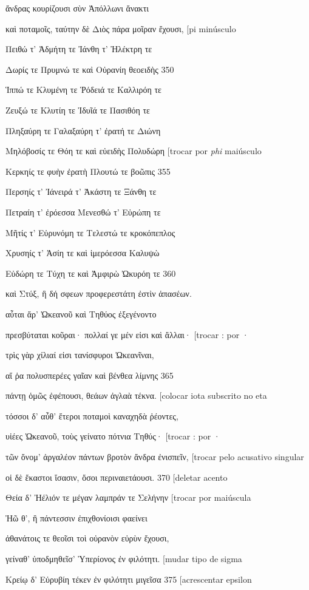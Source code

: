 ἄνδρας κουρίζουσι σὺν Ἀπόλλωνι ἄνακτι

καὶ ποταμοῖς, ταύτην δὲ Διὸς πάρα μοῖραν ἔχουσι, {[}pi minúsculo

Πειθώ τ' Ἀδμήτη τε Ἰάνθη τ' Ἠλέκτρη τε

Δωρίς τε Πρυμνώ τε καὶ Οὐρανίη θεοειδὴς 350

Ἱππώ τε Κλυμένη τε Ῥόδειά τε Καλλιρόη τε

Ζευξώ τε Κλυτίη τε Ἰδυῖά τε Πασιθόη τε

Πληξαύρη τε Γαλαξαύρη τ' ἐρατή τε Διώνη

Μηλόβοσίς τε Θόη τε καὶ εὐειδὴς Πολυδώρη {[}trocar por \emph{phi}
maiúsculo

Κερκηίς τε φυὴν ἐρατὴ Πλουτώ τε βοῶπις 355

Περσηίς τ' Ἰάνειρά τ' Ἀκάστη τε Ξάνθη τε

Πετραίη τ' ἐρόεσσα Μενεσθώ τ' Εὐρώπη τε

Μῆτίς τ' Εὐρυνόμη τε Τελεστώ τε κροκόπεπλος

Χρυσηίς τ' Ἀσίη τε καὶ ἱμερόεσσα Καλυψὼ

Εὐδώρη τε Τύχη τε καὶ Ἀμφιρὼ Ὠκυρόη τε 360

καὶ Στύξ, ἣ δή σφεων προφερεστάτη ἐστὶν ἁπασέων.

αὗται ἄρ' Ὠκεανοῦ καὶ Τηθύος ἐξεγένοντο

πρεσβύταται κοῦραι· πολλαί γε μέν εἰσι καὶ ἄλλαι· {[}trocar : por ·

τρὶς γὰρ χίλιαί εἰσι τανίσφυροι Ὠκεανῖναι,

αἵ ῥα πολυσπερέες γαῖαν καὶ βένθεα λίμνης 365

πάντῃ ὁμῶς ἐφέπουσι, θεάων ἀγλαὰ τέκνα. {[}colocar iota subscrito no eta

τόσσοι δ' αὖθ' ἕτεροι ποταμοὶ καναχηδὰ ῥέοντες,

υἱέες Ὠκεανοῦ, τοὺς γείνατο πότνια Τηθύς· {[}trocar : por ·

τῶν ὄνομ' ἀργαλέον πάντων βροτὸν ἄνδρα ἐνισπεῖν, {[}trocar pelo
acusativo singular

οἱ δὲ ἕκαστοι ἴσασιν, ὅσοι περιναιετάουσι. 370 {[}deletar acento

Θεία δ' Ἠέλιόν τε μέγαν λαμπράν τε Σελήνην {[}trocar por maiúscula

Ἠῶ θ', ἣ πάντεσσιν ἐπιχθονίοισι φαείνει

ἀθανάτοις τε θεοῖσι τοὶ οὐρανὸν εὐρὺν ἔχουσι,

γείναθ' ὑποδμηθεῖσ' Ὑπερίονος ἐν φιλότητι. {[}mudar tipo de sigma

Κρείῳ δ' Εὐρυβίη τέκεν ἐν φιλότητι μιγεῖσα 375 {[}acrescentar epsilon

